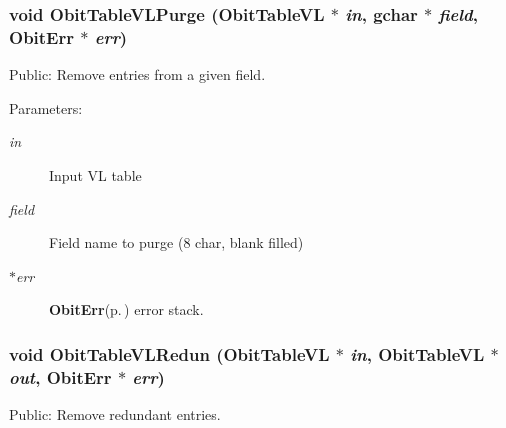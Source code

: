 \subsubsection{\setlength{\rightskip}{0pt plus 5cm}void Obit\-Table\-VLPurge ({\bf Obit\-Table\-VL} $\ast$ {\em in}, gchar $\ast$ {\em field}, {\bf Obit\-Err} $\ast$ {\em err})}\label{ObitTableVLUtil_8h_a4}


Public: Remove entries from a given field. 

\begin{Desc}
\item[Parameters:]
\begin{description}
\item[{\em in}]Input VL table \item[{\em field}]Field name to purge (8 char, blank filled) \item[{\em $\ast$err}]{\bf Obit\-Err}{\rm (p.\,\pageref{structObitErr})} error stack. \end{description}
\end{Desc}
\subsubsection{\setlength{\rightskip}{0pt plus 5cm}void Obit\-Table\-VLRedun ({\bf Obit\-Table\-VL} $\ast$ {\em in}, {\bf Obit\-Table\-VL} $\ast$ {\em out}, {\bf Obit\-Err} $\ast$ {\em err})}\label{ObitTableVLUtil_8h_a5}


Public: Remove redundant entries. 

